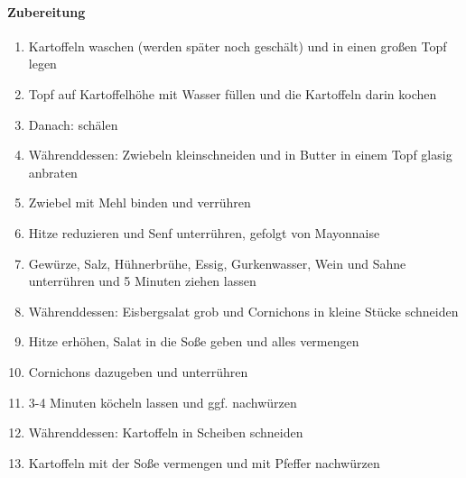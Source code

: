 \paragraph{Zubereitung}
\begin{enumerate}[noitemsep]
	\item Kartoffeln waschen (werden später noch geschält) und in einen großen Topf legen
	\item Topf auf Kartoffelhöhe mit Wasser füllen und die Kartoffeln darin kochen
	\item Danach: schälen
	\item Währenddessen: Zwiebeln kleinschneiden und in Butter in einem Topf glasig anbraten
	\item Zwiebel mit Mehl binden und verrühren
	\item Hitze reduzieren und Senf unterrühren, gefolgt von Mayonnaise
	\item Gewürze, Salz, Hühnerbrühe, Essig, Gurkenwasser, Wein und Sahne unterrühren und 5 Minuten ziehen lassen
	\item Währenddessen: Eisbergsalat grob und Cornichons in kleine Stücke schneiden
	\item Hitze erhöhen, Salat in die Soße geben und alles vermengen
	\item Cornichons dazugeben und unterrühren
	\item 3-4 Minuten köcheln lassen und ggf. nachwürzen
	\item Währenddessen: Kartoffeln in Scheiben schneiden
	\item Kartoffeln mit der Soße vermengen und mit Pfeffer nachwürzen
\end{enumerate}
